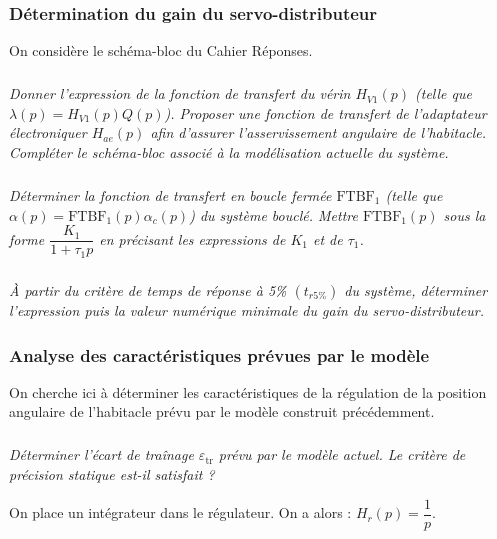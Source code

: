 \documentclass[10pt,fleqn]{article} %
\begin{document}
\begin{multicols}{2}
\subsubsection*{Détermination du gain du servo-distributeur}

On considère le schéma-bloc du Cahier Réponses.

\subparagraph{}\textit{Donner l'expression de la fonction de transfert du vérin $H_{V1}(p)$ (telle que $\lambda(p) = H_{V1}(p) Q(p)$). Proposer une fonction de transfert de l'adaptateur électroniquer $H_{ae}(p)$ afin d'assurer l'asservissement angulaire de l'habitacle. Compléter le schéma-bloc associé à la modélisation actuelle du système.}
\ifprof
\begin{corrige}
\end{corrige}
\else
\fi


\subparagraph{}\textit{Déterminer la fonction de transfert en boucle fermée $\text{FTBF}_1$ (telle que $\alpha(p) = \text{FTBF}_1(p) \alpha_c(p)$) du système bouclé. Mettre  $\text{FTBF}_1(p)$ sous la forme 
$\dfrac{K_1}{1+\tau_1 p}$ en précisant les expressions de $K_1$ et de $\tau_1$.} 
\ifprof
\begin{corrige}
\end{corrige}
\else
\fi


\subparagraph{}\textit{ À partir du critère de temps de réponse à 5\% $(t_{r5\%})$ du système, déterminer l'expression puis la valeur numérique minimale du gain du servo-distributeur.} 
\ifprof
\begin{corrige}
\end{corrige}
\else
\fi



\subsubsection*{Analyse des caractéristiques prévues par le modèle}

On cherche ici à déterminer les caractéristiques de la régulation de la position angulaire de l'habitacle prévu par le modèle construit précédemment.

\subparagraph{}\textit{ Déterminer l'écart de traînage $\varepsilon_{\text{tr}}$ prévu par le modèle actuel. Le critère de précision statique est-il satisfait ?} 
\ifprof
\begin{corrige}
\end{corrige}
\else
\fi


On place un intégrateur dans le régulateur. On a alors : $H_r(p)=\dfrac{1}{p}$.
 


\end{multicols}
\end{document}
